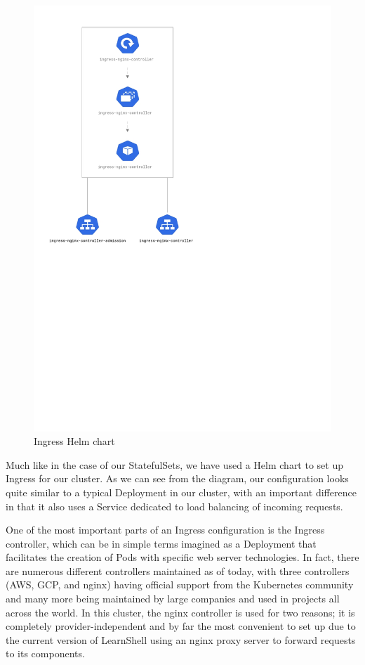 \documentclass[thesis=B,english]{FITthesis}[2019/12/23]
\begin{document}
\begin{figure}[H]
\centering
\caption{Ingress Helm chart}
\hspace*{1cm}
\includegraphics[scale=0.5]{ingress-diagram}
\end{figure}

Much like in the case of our StatefulSets, we have used a Helm chart to set up Ingress for our cluster. As we can see from the diagram, our configuration looks quite similar to a typical Deployment in our cluster, with an important difference in that it also uses a Service dedicated to load balancing of incoming requests.

One of the most important parts of an Ingress configuration is the Ingress controller, which can be in simple terms imagined as a Deployment that facilitates the creation of Pods with specific web server technologies. In fact, there are numerous different controllers maintained as of today, with three controllers (AWS, GCP, and nginx) having official support from the Kubernetes community and many more being maintained by large companies and used in projects all across the world. In this cluster, the nginx controller is used for two reasons; it is completely provider-independent and by far the most convenient to set up due to the current version of LearnShell using an nginx proxy server to forward requests to its components.
\end{document}
